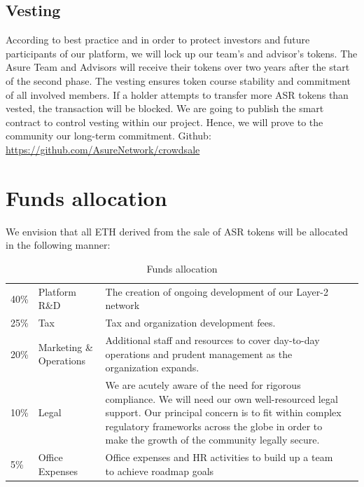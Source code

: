 \subsection{Vesting}
According to best practice and in order to protect investors and future participants of our platform, we will lock up our team’s and advisor's tokens. The Asure Team and Advisors will receive their tokens over two years after the start of the second phase.
The vesting ensures token course stability and commitment of all involved members. If a holder attempts to transfer more ASR tokens than vested, the transaction will be blocked.
We are going to publish the smart contract to control vesting within our project. Hence, we will prove to the community our long-term commitment.
\newline\newline
Github: \url{https://github.com/AsureNetwork/crowdsale}

\section{Funds allocation}

We envision that all ETH derived from the sale of ASR tokens will be allocated in the following manner:
\newline\newline

\begin{table}[H]
\begin{tabular}{llp{}l}
  40\% & Platform R\&D & The creation of ongoing development of our Layer-2 network \\
  25\% & Tax & Tax and organization development fees.\\
  20\% & Marketing \& Operations & Additional staff and resources to cover day-to-day operations and prudent management as the organization expands. \\
  10\% & Legal & We are acutely aware of the need for rigorous compliance. We will need our own well-resourced legal support. Our principal concern is to fit within complex regulatory frameworks across the globe in order to make the growth of the community legally secure. \\

  5\% & Office Expenses & Office expenses and HR activities to build up
        a team to achieve roadmap goals
\end{tabular}
\caption{\label{tab:table-name}Funds allocation}
\end{table}

